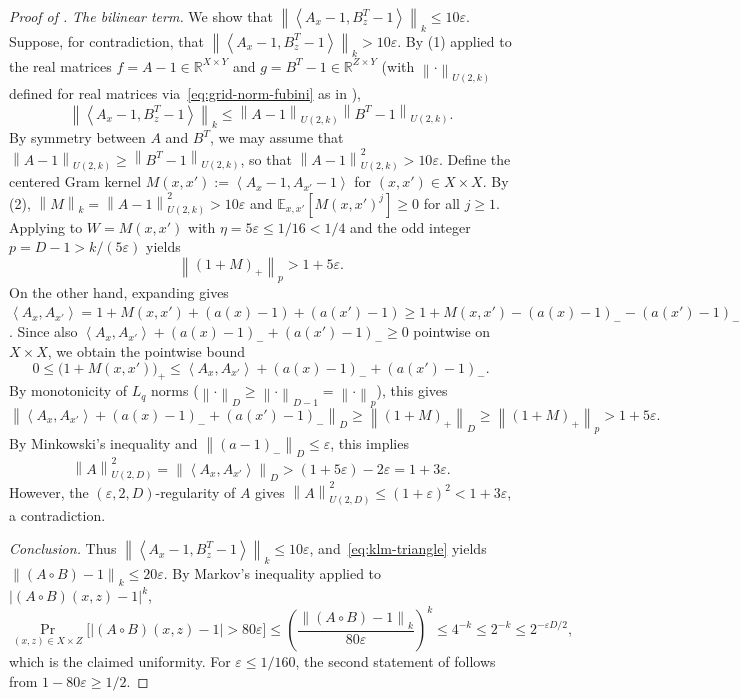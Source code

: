 \documentclass[11pt]{article}
\theoremstyle{definition}
\newcommand{\E}{\mathbb{E}}
\newcommand{\R}{\mathbb{R}}
\newcommand{\norm}[1]{\left\lVert #1 \right\rVert}
\newcommand{\abs}[1]{\left\lvert #1 \right\rvert}
\newcommand{\ip}[2]{\left\langle #1, #2 \right\rangle}
\begin{document}
\begin{proof}[Proof of ]
\emph{The bilinear term.} We show that $\norm{\ip{A_x - 1}{B^T_z - 1}}_k \le 10\varepsilon$. Suppose, for contradiction, that $\norm{\ip{A_x - 1}{B^T_z - 1}}_k > 10\varepsilon$. By (1) applied to the real matrices $f = A - 1 \in \R^{X \times Y}$ and $g = B^T - 1 \in \R^{Z \times Y}$ (with $\norm{\cdot}_{U(2, k)}$ defined for real matrices via~\eqref{eq:grid-norm-fubini} as in ),
\[
    \norm{\ip{A_x - 1}{B^T_z - 1}}_k \le \norm{A - 1}_{U(2, k)} \norm{B^T - 1}_{U(2, k)}.
\]
By symmetry between $A$ and $B^T$, we may assume that $\norm{A - 1}_{U(2, k)} \ge \norm{B^T - 1}_{U(2, k)}$, so that $\norm{A - 1}_{U(2, k)}^2 > 10\varepsilon$. Define the centered Gram kernel $M(x, x') := \ip{A_x - 1}{A_{x'} - 1}$ for $(x, x') \in X \times X$. By (2), $\norm{M}_k = \norm{A - 1}_{U(2, k)}^2 > 10\varepsilon$ and $\E_{x, x'}[M(x, x')^j] \ge 0$ for all $j \ge 1$. Applying  to $W = M(x, x')$ with $\eta = 5\varepsilon \le 1/16 < 1/4$ and the odd integer $p = D - 1 > k/(5\varepsilon)$ yields
\[
    \norm{(1 + M)_+}_p > 1 + 5\varepsilon.
\]
On the other hand, expanding gives $\ip{A_x}{A_{x'}} = 1 + M(x, x') + (a(x) - 1) + (a(x') - 1) \ge 1 + M(x, x') - (a(x) - 1)_- - (a(x') - 1)_-$. Since also $\ip{A_x}{A_{x'}} + (a(x) - 1)_- + (a(x') - 1)_- \ge 0$ pointwise on $X \times X$, we obtain the pointwise bound
\[
    0 \le \big(1 + M(x, x')\big)_+ \le \ip{A_x}{A_{x'}} + (a(x) - 1)_- + (a(x') - 1)_-.
\]
By monotonicity of $L_q$ norms ($\norm{\cdot}_D \ge \norm{\cdot}_{D-1} = \norm{\cdot}_p$), this gives
\[
    \norm{\ip{A_x}{A_{x'}} + (a(x) - 1)_- + (a(x') - 1)_-}_D \ge \norm{(1 + M)_+}_D \ge \norm{(1 + M)_+}_p > 1 + 5\varepsilon.
\]
By Minkowski's inequality and $\norm{(a - 1)_-}_D \le \varepsilon$, this implies
\[
    \norm{A}_{U(2, D)}^2 = \norm{\ip{A_x}{A_{x'}}}_D > (1 + 5\varepsilon) - 2\varepsilon = 1 + 3\varepsilon.
\]
However, the $(\varepsilon, 2, D)$-regularity of $A$ gives $\norm{A}_{U(2, D)}^2 \le (1 + \varepsilon)^2 < 1 + 3\varepsilon$, a contradiction.

\emph{Conclusion.} Thus $\norm{\ip{A_x - 1}{B^T_z - 1}}_k \le 10\varepsilon$, and~\eqref{eq:klm-triangle} yields $\norm{(A \circ B) - 1}_k \le 20\varepsilon$. By Markov's inequality applied to $\abs{(A \circ B)(x, z) - 1}^k$,
\[
    \Pr_{(x, z) \in X \times Z}\big[\abs{(A \circ B)(x, z) - 1} > 80\varepsilon\big] \le \left(\frac{\norm{(A \circ B) - 1}_k}{80\varepsilon}\right)^k \le 4^{-k} \le 2^{-k} \le 2^{-\varepsilon D / 2},
\]
which is the claimed uniformity. For $\varepsilon \le 1/160$, the second statement of  follows from $1 - 80\varepsilon \ge 1/2$.
\end{proof}
\end{document}
